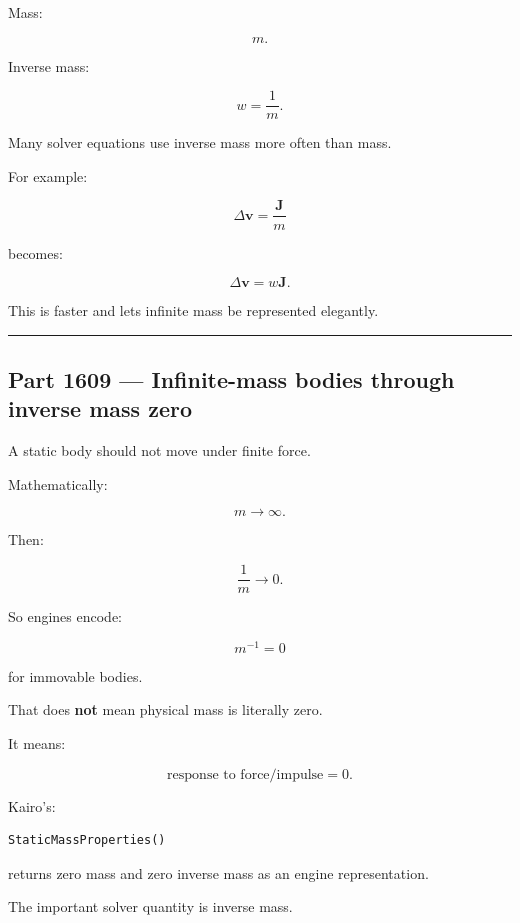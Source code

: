 \hypertarget{06-engine-ii-ch034-part-1608-mass-versus-inverse-mass}{}

Mass:

\[
m.
\]

Inverse mass:

\[
w=
\frac{1}{m}.
\]

Many solver equations use inverse mass more often than mass.

For example:

\[
\Delta\mathbf{v}
=
\frac{\mathbf{J}}{m}
\]

becomes:

\[
\boxed{
\Delta\mathbf{v}
=
w\mathbf{J}.
}
\]

This is faster and lets infinite mass be represented elegantly.

\begin{center}\rule{0.5\linewidth}{0.5pt}\end{center}

\subsection{Part 1609 --- Infinite-mass bodies through inverse mass zero}\label{06-engine-ii-ch034-part-1609-infinite-mass-bodies-through-inverse-mass-zero}

\hypertarget{06-engine-ii-ch034-part-1609-infinite-mass-bodies-through-inverse-mass-zero}{}

A static body should not move under finite force.

Mathematically:

\[
m\rightarrow\infty.
\]

Then:

\[
\frac{1}{m}
\rightarrow0.
\]

So engines encode:

\[
\boxed{
m^{-1}=0
}
\]

for immovable bodies.

That does \textbf{not} mean physical mass is literally zero.

It means:

\[
\text{response to force/impulse}=0.
\]

Kairo's:

\begin{verbatim}
StaticMassProperties()
\end{verbatim}

returns zero mass and zero inverse mass as an engine representation.

The important solver quantity is inverse mass.


